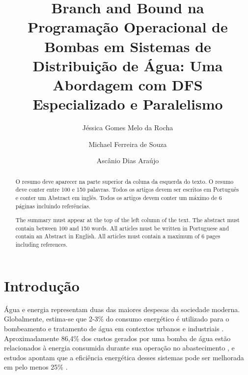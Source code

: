 \documentclass[12pt,a4paper,oneside,linenumbers=off,latinmodern=off,timesnews=off,english,spanish]{rctart-class/rctart}
\title{Branch and Bound na Programação Operacional de Bombas em Sistemas de Distribuição de Água: Uma Abordagem com DFS Especializado e Paralelismo}
\author[1,$\dagger$]{Jéssica Gomes Melo da Rocha}
\author[2]{Michael Ferreira de Souza}
\author[3,$\dagger$]{Ascânio Dias Araújo}
\affil[1]{Universidade Federal do Ceará, Fortaleza, Ceará, Brasil – \url{jessica@fisica.ufc.br}}
\affil[2]{Universidade Federal do Ceará, Fortaleza, Ceará, Brasil – \url{michael@ufc.br}}
\affil[3]{Universidade Federal do Ceará, Fortaleza, Ceará, Brasil – \url{ascanio@fisica.ufc.br}}
\begin{document}
\twocolumn[
    \maketitle
    \thispagestyle{firststyle}
    \linenumbers 



]
\begin{abstract}
   O resumo deve aparecer na parte superior da coluna da esquerda do texto.  O resumo deve conter entre 100 e 150 palavras. Todos os artigos devem ser escritos em Português e conter um Abstract em inglês. Todos os artigos devem conter um máximo de 6 páginas incluindo referências. 
\end{abstract}

\begin{otherlanguage}{english}
\begin{abstract}
  The summary must appear at the top of the left column of the text.  The abstract must contain between 100 and 150 words. All articles must be written in Portuguese and contain an Abstract in English. All articles must contain a maximum of 6 pages including references.
\end{abstract}
\end{otherlanguage}


\section{Introdução\label{sec:intro}}

Água e energia representam duas das maiores despesas da sociedade moderna. Globalmente, estima-se que 2-3\% do consumo energético é utilizado para o bombeamento e tratamento de água em contextos urbanos e industriais \cite{M2012}. Aproximadamente 86,4\% dos custos gerados por uma bomba de água estão relacionados à energia consumida durante sua operação no abastecimento \cite{Nault2015}, e estudos apontam que a eficiência energética desses sistemas pode ser melhorada em pelo menos 25\% \cite{Moreira2013}.
\end{document}
